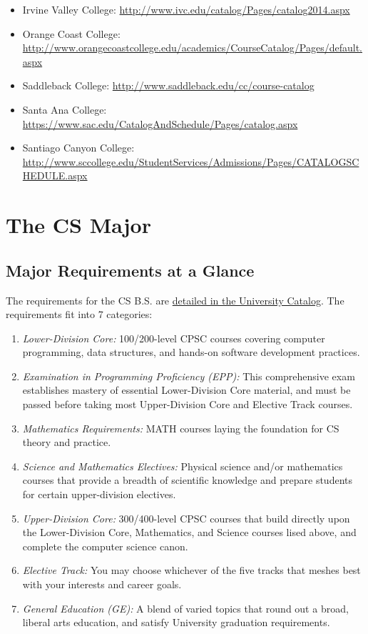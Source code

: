 \documentclass{book}
\begin{document}
\begin{itemize}
\begin{itemize}
    \item Irvine Valley College: \url{http://www.ivc.edu/catalog/Pages/catalog2014.aspx}
    \item Orange Coast College: \url{http://www.orangecoastcollege.edu/academics/CourseCatalog/Pages/default.aspx}
    \item Saddleback College: \url{http://www.saddleback.edu/cc/course-catalog}
    \item Santa Ana College: \url{https://www.sac.edu/CatalogAndSchedule/Pages/catalog.aspx}
    \item Santiago Canyon College: \url{http://www.sccollege.edu/StudentServices/Admissions/Pages/CATALOGSCHEDULE.aspx}
  \end{itemize}
\end{itemize}

\chapter{The CS Major}

\section{Major Requirements at a Glance}

The requirements for the CS B.S. are \href{http://catalog.fullerton.edu/preview_program.php?catoid=2&poid=537&returnto=137}{detailed in the University Catalog}. The requirements fit into 7 categories:
\begin{enumerate}
\item \emph{Lower-Division Core:} 100/200-level CPSC courses covering computer programming, data structures, and hands-on software development practices.
\item \emph{Examination in Programming Proficiency (EPP):} This comprehensive exam establishes mastery of essential Lower-Division Core material, and must be passed before taking most Upper-Division Core and Elective Track courses. 
\item \emph{Mathematics Requirements:} MATH courses laying the foundation for CS theory and practice.
\item \emph{Science and Mathematics Electives:} Physical science and/or mathematics courses that provide a breadth of scientific knowledge and prepare students for certain upper-division electives.
\item \emph{Upper-Division Core:} 300/400-level CPSC courses that build directly upon the Lower-Division Core, Mathematics, and Science courses lised above, and complete the computer science canon.
\item \emph{Elective Track:} You may choose whichever of the five tracks that meshes best with your interests and career goals.
\item \emph{General Education (GE):} A blend of varied topics that round out a broad, liberal arts education, and satisfy University graduation requirements.
\end{enumerate}
  
\end{document}
